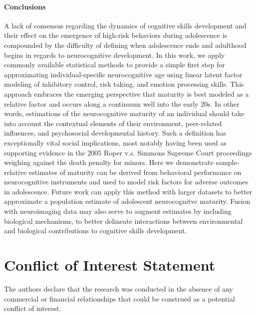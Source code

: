 \documentclass[utf8]{frontiersSCNS} %
\begin{document}
\paragraph*{Conclusions} A lack of consensus regarding the dynamics of cognitive skills development and their effect on the emergence of high-risk behaviors during adolescence is compounded by the difficulty of defining when adolescence ends and adulthood begins in regards to neurocognitive development. In this work, we apply commonly available statistical methods to provide a simple first step for approximating individual-specific neurocognitive age using linear latent factor modeling of inhibitory control, risk taking, and emotion processing skills. This approach embraces the emerging perspective that maturity is best modeled as a relative factor and occurs along a continuum well into the early 20s. In other words, estimations of the neurocognitive maturity of an individual should take into account the contextual elements of their environment, peer-related influences, and psychosocial developmental history. Such a definition has exceptionally vital social implications, most notably having been used as supporting evidence in the 2005 Roper v.s. Simmons Supreme Court proceedings weighing against the death penalty for minors. Here we demonstrate sample-relative estimates of maturity can be derived from behavioral performance on neurocognitive instruments and used to model risk factors for adverse outcomes in adolescence. Future work can apply this method with larger datasets to better approximate a population estimate of adolescent neurocognitve maturity. Fusion with neuroimaging data may also serve to augment estimates by including biological mechanisms, to better delineate interactions between environmental and biological contributions to cognitive skills development.




\section*{Conflict of Interest Statement}
The authors declare that the research was conducted in the absence of any commercial or financial relationships that could be construed as a potential conflict of interest.
\end{document}
